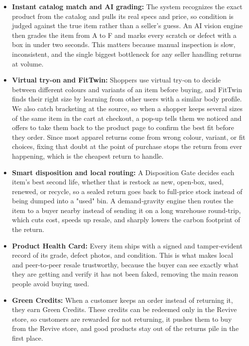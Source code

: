 \documentclass[11pt]{article}
\newcommand{\placeholder}[1]{{\color{placeGray} #1}}
\begin{document}
\begin{itemize}[leftmargin=2em,itemsep=6pt,topsep=4pt]

  \item \textbf{Instant catalog match and AI grading:} \placeholder{The system recognizes the exact product from the catalog and pulls its real specs and price, so condition is judged against the true item rather than a seller's guess. An AI vision engine then grades the item from A to F and marks every scratch or defect with a box in under two seconds. This matters because manual inspection is slow, inconsistent, and the single biggest bottleneck for any seller handling returns at volume.}

  \item \textbf{Virtual try-on and FitTwin:} \placeholder{Shoppers use virtual try‑on to decide between different colours and variants of an item before buying, and FitTwin finds their right size by learning from other users with a similar body profile. We also catch bracketing at the source, so when a shopper keeps several sizes of the same item in the cart at checkout, a pop‑up tells them we noticed and offers to take them back to the product page to confirm the best fit before they order. Since most apparel returns come from wrong colour, variant, or fit choices, fixing that doubt at the point of purchase stops the return from ever happening, which is the cheapest return to handle.}

  \item \textbf{Smart disposition and local routing:} \placeholder{A Disposition Gate decides each item's best second life, whether that is restock as new, open‑box, used, renewed, or recycle, so a sealed return goes back to full‑price stock instead of being dumped into a "used" bin. A demand‑gravity engine then routes the item to a buyer nearby instead of sending it on a long warehouse round‑trip, which cuts cost, speeds up resale, and sharply lowers the carbon footprint of the return.}

  \item \textbf{Product Health Card:} \placeholder{Every item ships with a signed and tamper‑evident record of its grade, defect photos, and condition. This is what makes local and peer‑to‑peer resale trustworthy, because the buyer can see exactly what they are getting and verify it has not been faked, removing the main reason people avoid buying used.}

  \item \textbf{Green Credits:} \placeholder{When a customer keeps an order instead of returning it, they earn Green Credits. These credits can be redeemed only in the Revive store, so customers are rewarded for not returning, it pushes them to buy from the Revive store, and good products stay out of the returns pile in the first place.}

\end{itemize}
\end{document}
